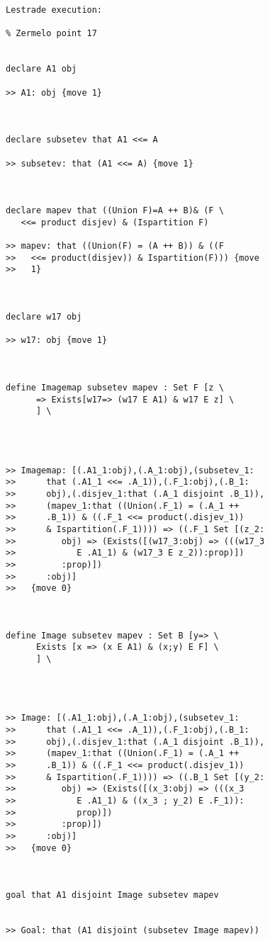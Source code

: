 \documentclass[12pt]{article}
\begin{document}
\begin{verbatim}Lestrade execution:

% Zermelo point 17


declare A1 obj

>> A1: obj {move 1}



declare subsetev that A1 <<= A

>> subsetev: that (A1 <<= A) {move 1}



declare mapev that ((Union F)=A ++ B)& (F \
   <<= product disjev) & (Ispartition F)

>> mapev: that ((Union(F) = (A ++ B)) & ((F
>>   <<= product(disjev)) & Ispartition(F))) {move
>>   1}



declare w17 obj

>> w17: obj {move 1}



define Imagemap subsetev mapev : Set F [z \
      => Exists[w17=> (w17 E A1) & w17 E z] \
      ] \
   



>> Imagemap: [(.A1_1:obj),(.A_1:obj),(subsetev_1:
>>      that (.A1_1 <<= .A_1)),(.F_1:obj),(.B_1:
>>      obj),(.disjev_1:that (.A_1 disjoint .B_1)),
>>      (mapev_1:that ((Union(.F_1) = (.A_1 ++
>>      .B_1)) & ((.F_1 <<= product(.disjev_1))
>>      & Ispartition(.F_1)))) => ((.F_1 Set [(z_2:
>>         obj) => (Exists([(w17_3:obj) => (((w17_3
>>            E .A1_1) & (w17_3 E z_2)):prop)])
>>         :prop)])
>>      :obj)]
>>   {move 0}



define Image subsetev mapev : Set B [y=> \
      Exists [x => (x E A1) & (x;y) E F] \
      ] \
   



>> Image: [(.A1_1:obj),(.A_1:obj),(subsetev_1:
>>      that (.A1_1 <<= .A_1)),(.F_1:obj),(.B_1:
>>      obj),(.disjev_1:that (.A_1 disjoint .B_1)),
>>      (mapev_1:that ((Union(.F_1) = (.A_1 ++
>>      .B_1)) & ((.F_1 <<= product(.disjev_1))
>>      & Ispartition(.F_1)))) => ((.B_1 Set [(y_2:
>>         obj) => (Exists([(x_3:obj) => (((x_3
>>            E .A1_1) & ((x_3 ; y_2) E .F_1)):
>>            prop)])
>>         :prop)])
>>      :obj)]
>>   {move 0}



goal that A1 disjoint Image subsetev mapev


>> Goal: that (A1 disjoint (subsetev Image mapev))



\end{verbatim}
\end{document}

